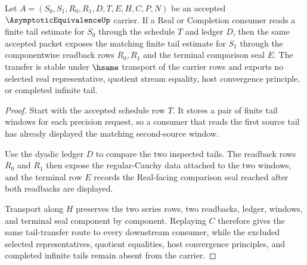 \begin{theorem}
\label{thm:asymptotic-equivalence-tail-transfer}
Let $A=(S_0,S_1,R_0,R_1,D,T,E,H,C,P,N)$ be an accepted $\AsymptoticEquivalenceUp$ carrier. If a Real or Completion consumer reads a finite tail estimate for $S_0$ through the schedule $T$ and ledger $D$, then the same accepted packet exposes the matching finite tail estimate for $S_1$ through the componentwise readback rows $R_0,R_1$ and the terminal comparison seal $E$. The transfer is stable under $\hsame$ transport of the carrier rows and exports no selected real representative, quotient stream equality, host convergence principle, or completed infinite tail.
\end{theorem}
\begin{proof}
Start with the accepted schedule row $T$. It stores a pair of finite tail windows for each precision request, so a consumer that reads the first source tail has already displayed the matching second-source window.

Use the dyadic ledger $D$ to compare the two inspected tails. The readback rows $R_0$ and $R_1$ then expose the regular-Cauchy data attached to the two windows, and the terminal row $E$ records the Real-facing comparison seal reached after both readbacks are displayed.

Transport along $H$ preserves the two series rows, two readbacks, ledger, windows, and terminal seal component by component. Replaying $C$ therefore gives the same tail-transfer route to every downstream consumer, while the excluded selected representatives, quotient equalities, host convergence principles, and completed infinite tails remain absent from the carrier.
\end{proof}

\begin{closurestatus}{\AsymptoticEquivalenceUp}
  \theoryclosure{\seedClosure}
  \formalstatus{\unformalizedV}
\end{closurestatus}
